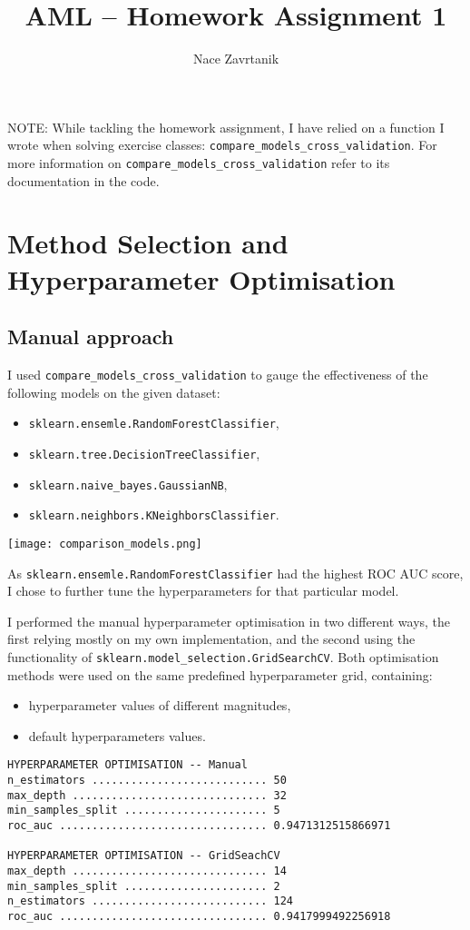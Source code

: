 \documentclass[12pt, a4paper]{article}
\title{AML -- Homework Assignment 1}
\author{Nace Zavrtanik}
\begin{document}
\maketitle


\noindent NOTE: While tackling the homework assignment, I have relied on a function I wrote when solving exercise classes:
\verb|compare_models_cross_validation|. For more information on \verb|compare_models_cross_validation| refer
to its documentation in the code.

\section{Method Selection and Hyperparameter Optimisation}


\subsection{Manual approach}
I used \verb|compare_models_cross_validation| to gauge the effectiveness of the following models on the given dataset:
\begin{itemize}
\item \verb|sklearn.ensemle.RandomForestClassifier|,
\item \verb|sklearn.tree.DecisionTreeClassifier|,
\item \verb|sklearn.naive_bayes.GaussianNB|,
\item \verb|sklearn.neighbors.KNeighborsClassifier|.
\end{itemize}
\begin{center}
\texttt{[image: comparison\_models.png]}
\end{center}
As \verb|sklearn.ensemle.RandomForestClassifier| had the highest ROC AUC score, I chose to further tune the hyperparameters
for that particular model.

I performed the manual hyperparameter optimisation in two different ways, the first relying mostly on my own
implementation, and the second using the functionality of \verb|sklearn.model_selection.GridSearchCV|. Both
optimisation methods were used on the same predefined hyperparameter grid, containing:
\begin{itemize}
\item hyperparameter values of different magnitudes,
\item default hyperparameters values.
\end{itemize}

\begin{verbatim}
HYPERPARAMETER OPTIMISATION -- Manual
n_estimators ........................... 50
max_depth .............................. 32
min_samples_split ...................... 5
roc_auc ................................ 0.9471312515866971

HYPERPARAMETER OPTIMISATION -- GridSeachCV
max_depth .............................. 14
min_samples_split ...................... 2
n_estimators ........................... 124
roc_auc ................................ 0.9417999492256918
\end{verbatim}
\end{document}
